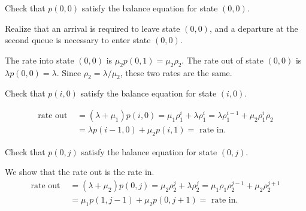 \begin{exercise}\label{ex:72}
Check that $p(0,0)$ satisfy the balance equation for state $(0,0)$.
\begin{hint}
  Realize that an arrival is required to leave state $(0,0)$, and a departure at the second queue is necessary to enter state $(0,0)$.
\end{hint}
\begin{solution}
  The rate into state $(0,0)$ is $\mu_2 p(0,1) = \mu_2 \rho_2$. The rate out of state $(0,0)$ is $\lambda p(0,0) = \lambda$. Since $\rho_2=\lambda/\mu_2$, these two rates are the same.
\end{solution}
\end{exercise}

\begin{exercise}
Check that $p(i,0)$ satisfy the balance equation for state $(i,0)$.
\begin{solution}
  \begin{align*}
    \text{rate out } &=(\lambda + \mu_1) p(i,0) = \mu_1 \rho_1^i + \lambda \rho_1^i = \lambda \rho_1^{i-1} + \mu_2 \rho_1^i \rho_2 \\
    &= \lambda p(i-1,0) + \mu_2 p(i, 1) = \text{ rate in}.
  \end{align*}
\end{solution}
\end{exercise}

\begin{exercise}\label{ex:75}
Check that $p(0,j)$ satisfy the balance equation for state $(0,j)$.
\begin{solution} We show that the rate out is the rate in.
  \begin{align*}
    \text{rate out } &=(\lambda + \mu_2) p(0, j) = \mu_2 \rho_2^j + \lambda \rho_2^j
                     = \mu_1\rho_1 \rho_2^{j-1} + \mu_2 \rho_2^{j+1} \\
    &= \mu_1 p(1,j-1) + \mu_2 p(0, j+1) = \text{ rate in}.
  \end{align*}
\end{solution}
\end{exercise}




